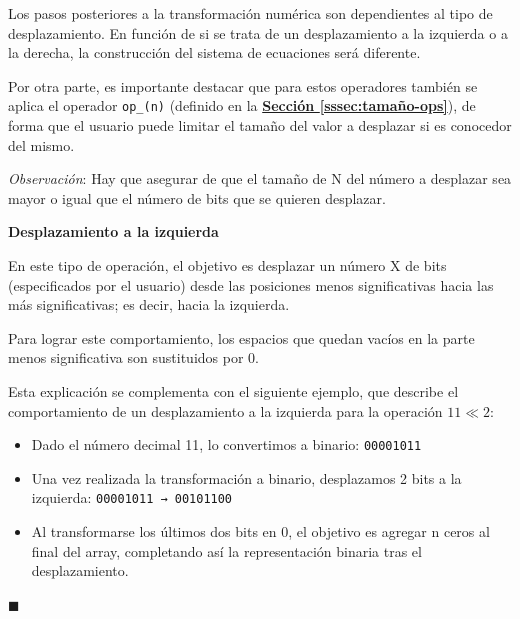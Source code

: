 \documentclass[a4paper,12pt]{report}
\begin{document}
	\vspace{0.2cm}
	\noindent Los pasos posteriores a la transformación numérica son dependientes al tipo de desplazamiento. En función de si se trata de un desplazamiento a la izquierda o a la derecha, la construcción del sistema de ecuaciones será diferente.
	
	\vspace{0.2cm}
	\noindent Por otra parte, es importante destacar que para estos operadores también se aplica el operador \texttt{op\_(n)} (definido en la \hyperref[sssec:tamaño-ops]{\textbf{Sección \ref{sssec:tamaño-ops}}}), de forma que el usuario puede limitar el tamaño del valor a desplazar si es conocedor del mismo.
	
	\vspace{0.2cm}
	\noindent \textit{Observación}: Hay que asegurar de que el tamaño de N del número a desplazar sea mayor o igual que el número de bits que se quieren desplazar.
	
	\vspace{0.6cm}
	\noindent \textbf{Desplazamiento a la izquierda}
	\vspace{0.2cm}
	
	\label{sssec:desp-izq}  
	\noindent En este tipo de operación, el objetivo es desplazar un número X de bits (especificados por el usuario) desde las posiciones menos significativas hacia las más significativas; es decir, hacia la izquierda.
	
	\vspace{0.2cm}
	\noindent Para lograr este comportamiento, los espacios que quedan vacíos en la parte menos significativa son sustituidos por 0.
	
	\vspace{0.2cm}
	\noindent Esta explicación se complementa con el siguiente ejemplo, que describe el comportamiento de un desplazamiento a la izquierda para la operación $11 \ll 2$:
	
	\begin{mi_ejemplo}
		\caption{Desplazamiento a la izquierda}
		\label{ex:desp-izq}
		
		\begin{itemize}
			\item Dado el número decimal 11, lo convertimos a binario:     \texttt{00001011}
			
			\item Una vez realizada la transformación a binario, desplazamos 2 bits a la izquierda: \texttt{00001011 → 00101100}
			
			\item Al transformarse los últimos dos bits en 0, el objetivo es agregar n ceros al final del array, completando así la representación binaria tras el desplazamiento.
		\end{itemize}
		
		\hspace*{\fill} $\blacksquare$
	\end{mi_ejemplo}
	
\end{document}
